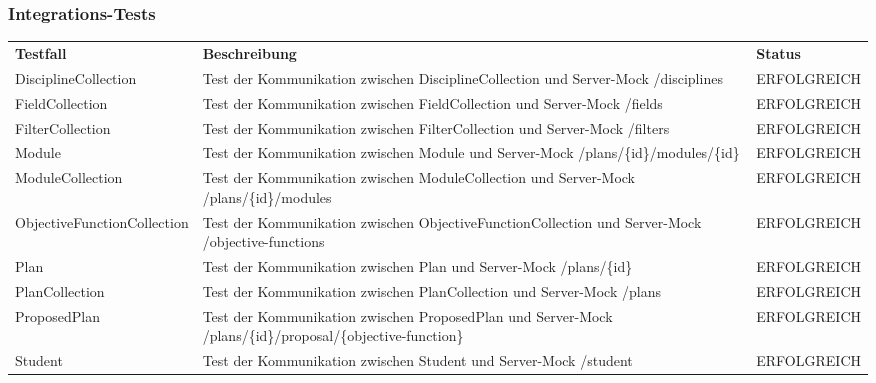 \subsubsection*{Integrations-Tests}
\begin{longtable}{| >{\hspace{0pt}} p{} | >{\hspace{0pt}} p{} | >{\hspace{0pt}} p{} |}
	\hline
	\textbf{Testfall} & \textbf{Beschreibung} & \textbf{Status} \\ 
	\hhline{|=|=|=|}  
	\endfirsthead
	\endhead
	
	DisciplineCollection & Test der Kommunikation zwischen DisciplineCollection und Server-Mock /disciplines & ERFOLGREICH \\ \hline
	FieldCollection & Test der Kommunikation zwischen FieldCollection und Server-Mock /fields & ERFOLGREICH \\ \hline
	FilterCollection & Test der Kommunikation zwischen FilterCollection und Server-Mock /filters & ERFOLGREICH \\ \hline
	Module & Test der Kommunikation zwischen Module und Server-Mock /plans/\{id\}/modules/\{id\} & ERFOLGREICH \\ \hline
	ModuleCollection & Test der Kommunikation zwischen ModuleCollection und Server-Mock /plans/\{id\}/modules & ERFOLGREICH \\ \hline
	ObjectiveFunctionCollection & Test der Kommunikation zwischen ObjectiveFunctionCollection und Server-Mock /objective-functions  & ERFOLGREICH \\ \hline
	Plan & Test der Kommunikation zwischen Plan und Server-Mock /plans/\{id\} & ERFOLGREICH \\ \hline
	PlanCollection & Test der Kommunikation zwischen PlanCollection und Server-Mock /plans & ERFOLGREICH \\ \hline
	ProposedPlan & Test der Kommunikation zwischen ProposedPlan und Server-Mock /plans/\{id\}/proposal/\{objective-function\} & ERFOLGREICH \\ \hline
	Student & Test der Kommunikation zwischen Student und Server-Mock /student & ERFOLGREICH \\ \hline
	
\end{longtable}
